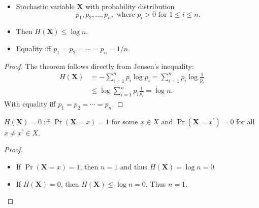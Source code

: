 \documentclass{beamer}
\let\stoch\mathbf{}
\begin{document}
\begin{frame}
  \begin{theorem}
    \begin{itemize}
      \item Stochastic variable \(\stoch X\) with probability distribution 
        \begin{equation*}
          p_1, p_2,\ldots, p_n, \text{ where } p_i > 0 \text{ for } 1\leq i\leq 
          n.
        \end{equation*}
      \item Then \(H(\stoch X)\leq \log n\).
      \item Equality iff \(p_1 = p_2 = \cdots = p_n = 1/n\).
    \end{itemize}
  \end{theorem}
\end{frame}

\begin{frame}
  \begin{proof}
    The theorem follows directly from Jensen's inequality:
    \begin{align*}
      H(\stoch X) &= -\sum_{i=1}^n p_i\log p_i = \sum_{i=1}^n 
      p_i\log\frac{1}{p_i} \\
      &\leq \log\sum_{i=1}^n p_i\frac{1}{p_i} = \log n.
    \end{align*}
    With equality iff \(p_1 = p_2 = \cdots = p_n\).
  \end{proof}
\end{frame}

\begin{frame}
  \begin{corollary}
    \(H(\stoch X) = 0\) iff \(\Pr(\stoch X = x) = 1\) for some \(x\in X\) and 
    \(\Pr(\stoch X = x^\prime) = 0\) for all \(x\neq x^\prime \in X\).
  \end{corollary}

  \begin{proof}
    \begin{itemize}
      \item If \(\Pr(\stoch X = x) = 1\), then \(n = 1\) and thus \(H(\stoch X) 
          = \log n = 0\).

      \item If \(H(\stoch X) = 0\), then \(H(\stoch X) \leq \log n = 0\).
        Thus \(n = 1\).
    \end{itemize}
  \end{proof}
\end{frame}
\end{document}
